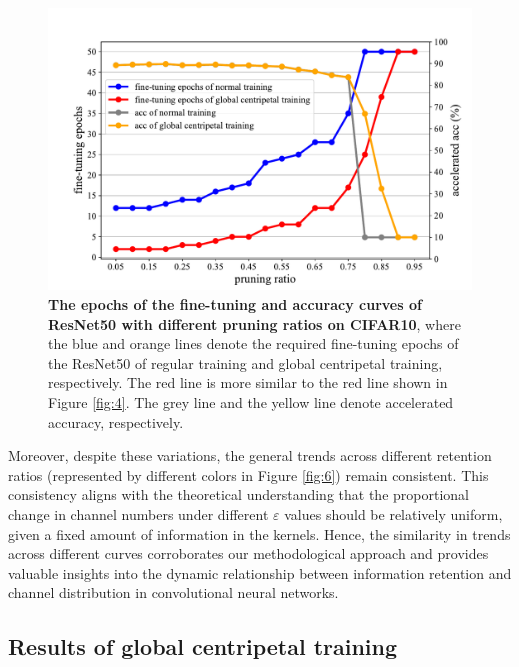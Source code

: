 \documentclass[sigconf, 10pt]{acmart}
\begin{document}
\begin{figure}
  \centering
   \includegraphics[width=\linewidth]{Fig8.pdf}
   \caption{\textbf{The epochs of the fine-tuning and accuracy curves of ResNet50 with different pruning ratios on CIFAR10}, where the blue and orange lines denote the required fine-tuning epochs of the ResNet50 of regular training and global centripetal training, respectively. The red line is more similar to the red line shown in Figure \ref{fig:4}. The grey line and the yellow line denote accelerated accuracy, respectively.}
   \label{fig:8}
\end{figure}

Moreover, despite these variations, the general trends across different retention ratios (represented by different colors in Figure \ref{fig:6}) remain consistent. This consistency aligns with the theoretical understanding that the proportional change in channel numbers under different \(\varepsilon\) values should be relatively uniform, given a fixed amount of information in the kernels. Hence, the similarity in trends across different curves corroborates our methodological approach and provides valuable insights into the dynamic relationship between information retention and channel distribution in convolutional neural networks.


\subsection{Results of global centripetal training}
\end{document}
